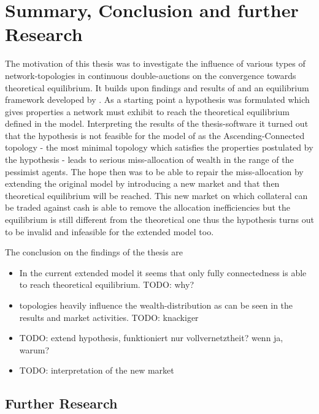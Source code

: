 \documentclass[Bachelorarbeit.tex]{subfiles}
\begin{document}
\chapter{Summary, Conclusion and further Research}

The motivation of this thesis was to investigate the influence of various types of network-topologies in continuous double-auctions on the convergence towards theoretical equilibrium. It builds upon findings and results of \cite{Breuer2015} and an equilibrium framework developed by \cite{Geanakoplos2009}. As a starting point a hypothesis was formulated which gives properties a network must exhibit to reach the theoretical equilibrium defined in the model. Interpreting the results of the thesis-software it turned out that the hypothesis is not feasible for the model of \cite{Breuer2015} as the Ascending-Connected topology - the most minimal topology which satisfies the properties postulated by the hypothesis - leads to serious miss-allocation of wealth in the range of the pessimist agents. The hope then was to be able to repair the miss-allocation by extending the original model by introducing a new market and that then theoretical equilibrium will be reached. This new market on which collateral can be traded against cash is able to remove the allocation inefficiencies but the equilibrium is still different from the theoretical one thus the hypothesis turns out to be invalid and infeasible for the extended model too.

\bigskip

The conclusion on the findings of the thesis are

\begin{itemize}
\item In the current extended model it seems that only fully connectedness is able to reach theoretical equilibrium. TODO: why?
\item topologies heavily influence the wealth-distribution as can be seen in the results and market activities. TODO: knackiger
\item TODO: extend hypothesis, funktioniert nur vollvernetztheit? wenn ja, warum?
\item TODO: interpretation of the new market
\end{itemize}

\section{Further Research}
\end{document}
